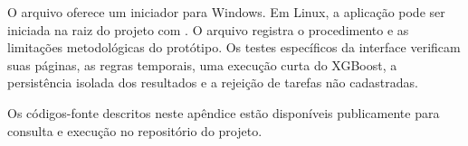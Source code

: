 O arquivo  oferece um iniciador para Windows. Em Linux, a aplicação pode ser iniciada na raiz do projeto com . O arquivo  registra o procedimento e as limitações metodológicas do protótipo. Os testes específicos da interface verificam suas páginas, as regras temporais, uma execução curta do XGBoost, a persistência isolada dos resultados e a rejeição de tarefas não cadastradas.

Os códigos-fonte descritos neste apêndice estão disponíveis publicamente para consulta e execução no repositório do projeto.
